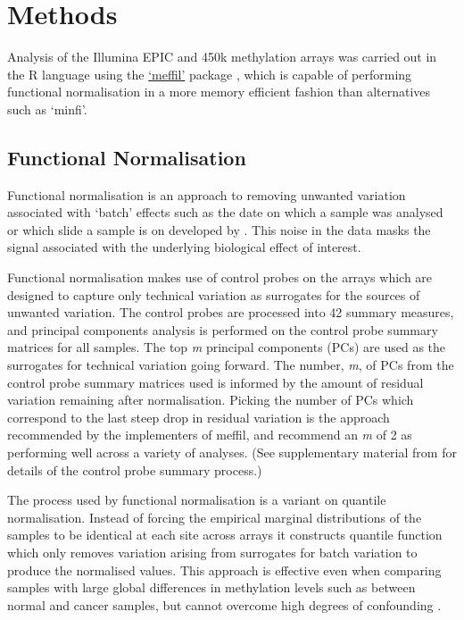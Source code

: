 \documentclass[
]{book}
\begin{document}
\hypertarget{methods-1}{%
\section{Methods}\label{methods-1}}

Analysis of the Illumina EPIC and 450k methylation arrays was carried out in the R language using the \href{https://github.com/perishky/meffil/wiki}{`meffil'} package \citep{Min2017}, which is capable of performing functional normalisation in a more memory efficient fashion than alternatives such as `minfi'.

\hypertarget{functional-normalisation}{%
\subsection{Functional Normalisation}\label{functional-normalisation}}

Functional normalisation is an approach to removing unwanted variation associated with `batch' effects such as the date on which a sample was analysed or which slide a sample is on developed by \citet{Fortin2014}.
This noise in the data masks the signal associated with the underlying biological effect of interest.

Functional normalisation makes use of control probes on the arrays which are designed to capture only technical variation as surrogates for the sources of unwanted variation.
The control probes are processed into 42 summary measures, and principal components analysis is performed on the control probe summary matrices for all samples.
The top \emph{m} principal components (PCs) are used as the surrogates for technical variation going forward.
The number, \emph{m}, of PCs from the control probe summary matrices used is informed by the amount of residual variation remaining after normalisation.
Picking the number of PCs which correspond to the last steep drop in residual variation is the approach recommended by the implementers of meffil, and \citet{Fortin2014} recommend an \emph{m} of 2 as performing well across a variety of analyses.
(See supplementary material from \citep{Fortin2014} for details of the control probe summary process.)

The process used by functional normalisation is a variant on quantile normalisation.
Instead of forcing the empirical marginal distributions of the samples to be identical at each site across arrays it constructs quantile function which only removes variation arising from surrogates for batch variation to produce the normalised values.
This approach is effective even when comparing samples with large global differences in methylation levels such as between normal and cancer samples, but cannot overcome high degrees of confounding \citep{Fortin2014}.
\end{document}

